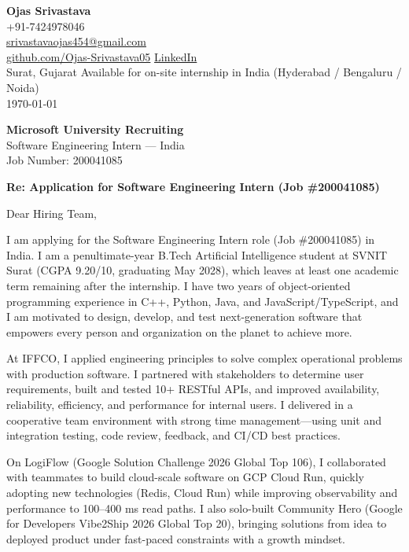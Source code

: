 \documentclass[a4paper,11pt]{article}
\begin{document}
\begin{flushright}
\textbf{Ojas Srivastava} \\
+91-7424978046 \\
\href{mailto:srivastavaojas454@gmail.com}{srivastavaojas454@gmail.com} \\
\href{https://github.com/Ojas-Srivastava05}{github.com/Ojas-Srivastava05} \textbar{}
\href{https://linkedin.com/in/ojas-srivastava05}{LinkedIn} \\
Surat, Gujarat \textbar{} Available for on-site internship in India (Hyderabad / Bengaluru / Noida) \\
\today
\end{flushright}

\vspace{4mm}
\textbf{Microsoft University Recruiting} \\
Software Engineering Intern --- India \\
Job Number: 200041085

\vspace{2mm}
\textbf{Re: Application for Software Engineering Intern (Job \#200041085)}

Dear Hiring Team,

I am applying for the Software Engineering Intern role (Job \#200041085) in India. I am a penultimate-year B.Tech Artificial Intelligence student at SVNIT Surat (CGPA 9.20/10, graduating May 2028), which leaves at least one academic term remaining after the internship. I have two years of object-oriented programming experience in C++, Python, Java, and JavaScript/TypeScript, and I am motivated to design, develop, and test next-generation software that empowers every person and organization on the planet to achieve more.

At IFFCO, I applied engineering principles to solve complex operational problems with production software. I partnered with stakeholders to determine user requirements, built and tested 10+ RESTful APIs, and improved availability, reliability, efficiency, and performance for internal users. I delivered in a cooperative team environment with strong time management---using unit and integration testing, code review, feedback, and CI/CD best practices.

On LogiFlow (Google Solution Challenge 2026 Global Top 106), I collaborated with teammates to build cloud-scale software on GCP Cloud Run, quickly adopting new technologies (Redis, Cloud Run) while improving observability and performance to 100--400 ms read paths. I also solo-built Community Hero (Google for Developers Vibe2Ship 2026 Global Top 20), bringing solutions from idea to deployed product under fast-paced constraints with a growth mindset.
\end{document}
